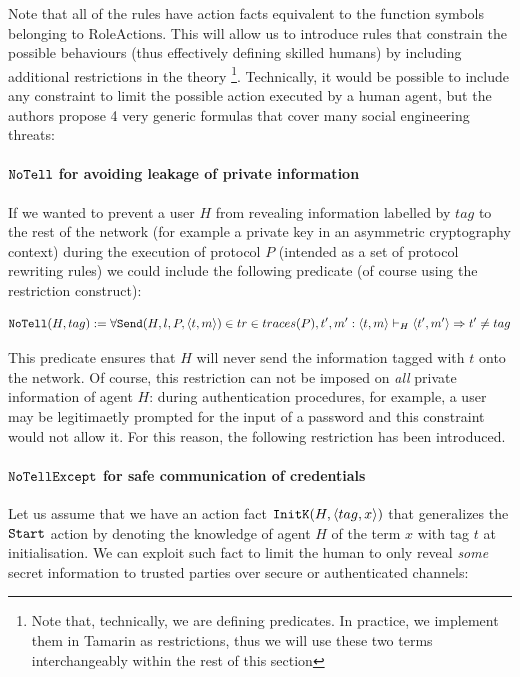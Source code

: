\documentclass{article}
\newcommand{\mono}[1]{\textrm{\tt #1}}
\begin{document}
Note that all of the rules have action facts equivalent to the function symbols belonging to $\textrm{RoleActions}$. This will allow us to introduce rules that constrain the possible behaviours (thus effectively defining skilled humans) by including additional restrictions in the theory \footnote{Note that, technically, we are defining predicates. In practice, we implement them in Tamarin as restrictions, thus we will use these two terms interchangeably within the rest of this section}. Technically, it would be possible to include any constraint to limit the possible action executed by a human agent, but the authors propose 4 very generic formulas that cover many social engineering threats:

\paragraph{$\mono{NoTell}$ for avoiding leakage of private information}

If we wanted to prevent a user $H$ from revealing information labelled by $tag$ to the rest of the network (for example a private key in an asymmetric cryptography context) during the execution of protocol $P$ (intended as a set of protocol rewriting rules) we could include the following predicate (of course using the restriction construct):

\begin{equation*}
    \mono{NoTell}(H, tag) := \forall \mono{Send}(H, l, P, \langle t,m \rangle) \in tr \in traces(P), t', m' : \langle t, m \rangle \vdash_H \langle t', m' \rangle \Rightarrow t' \not = tag
\end{equation*}

This predicate ensures that $H$ will never send the information tagged with $t$ onto the network. Of course, this restriction can not be imposed on \textit{all} private information of agent $H$: during authentication procedures, for example, a user may be legitimaetly prompted for the input of a password and this constraint would not allow it. For this reason, the following restriction has been introduced.

\paragraph{$\mono{NoTellExcept}$ for safe communication of credentials}

Let us assume that we have an action fact $\mono{InitK}(H, \langle tag, x \rangle)$ that generalizes the $\mono{Start}$ action by denoting the knowledge of agent $H$ of the term $x$ with tag $t$ at initialisation. We can exploit such fact to limit the human to only reveal \textit{some} secret information to trusted parties over secure or authenticated channels:
\end{document}
